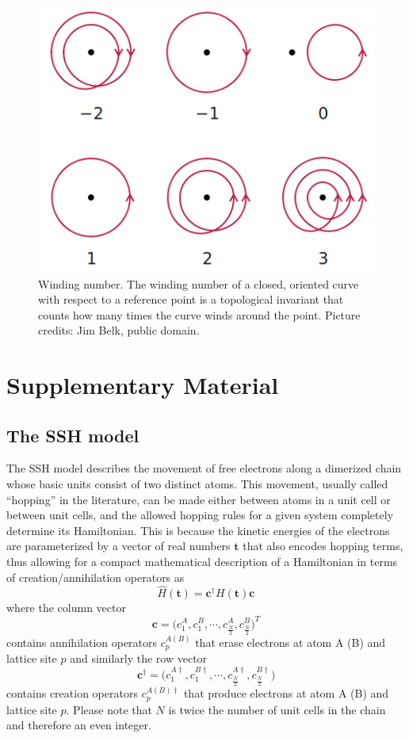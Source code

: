 \documentclass[fleqn,10pt]{wlscirep}
\begin{document}
\begin{figure}%
  \centering
  \includegraphics[width=.37\textwidth]{winding.png}
  \caption{Winding number. The winding number of a closed, oriented curve with respect to a reference point is a topological invariant that counts how many times the curve winds around the point. Picture credits: Jim Belk, public domain.}
\label{fig:winding}
\end{figure}


\section*{Supplementary Material}
\subsection*{The SSH model}
\label{sshapp}

The SSH model  describes the movement of free electrons along a dimerized chain whose basic units consist of two distinct atoms. This movement, usually called ``hopping'' in the literature, can be made either between atoms in a unit cell or between unit cells, and the allowed hopping rules for a given system completely determine its Hamiltonian. This is because the kinetic energies of the electrons are parameterized by a vector of real numbers $\mathbf{t}$ that also encodes hopping terms, thus allowing for a compact mathematical description of a Hamiltonian in terms of creation/annihilation operators as
\begin{equation}
\label{SSH}
\hat{H}(\mathbf{t})=\mathbf{c}^{\dagger}H(\mathbf{t})\mathbf{c}
\end{equation}
where the column vector
\begin{equation*}
\mathbf{c} =\Big(c^{A}_1,c^{B}_1,\cdots,c^{A}_\frac{N}{2},c^{B}_\frac{N}{2}\Big)^T
\end{equation*}
contains annihilation operators $c^{A(B)}_p$ that erase electrons at atom A (B) and lattice site $p$ and similarly the row vector
\begin{equation*}
\mathbf{c}^\dagger =\Big(c^{A\dagger}_1,c^{B\dagger}_1,\cdots,c^{A\dagger}_\frac{N}{2},c^{B\dagger}_\frac{N}{2}\Big)
\end{equation*}
contains creation operators $c^{A(B)\dagger}_p$ that produce electrons at atom A (B) and lattice site $p$. Please note that $N$ is twice the number of unit cells in the chain and therefore an even integer.
\end{document}
